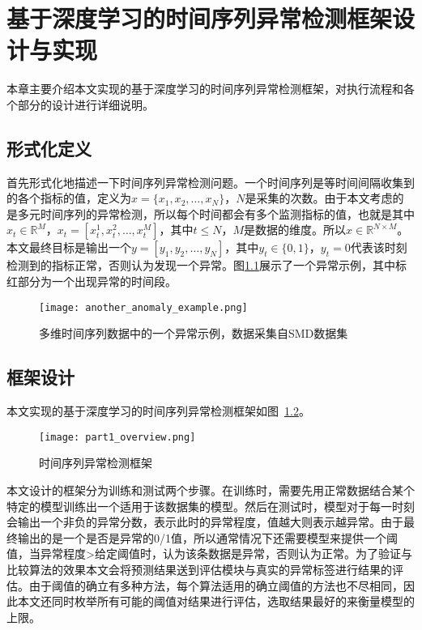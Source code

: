 
\chapter{基于深度学习的时间序列异常检测框架设计与实现}
\label{cha:anomaly:detection}
本章主要介绍本文实现的基于深度学习的时间序列异常检测框架，对执行流程和各个部分的设计进行详细说明。
\section{形式化定义}
首先形式化地描述一下时间序列异常检测问题。一个时间序列是等时间间隔收集到的各个指标的值，定义为$x=\{x_1,x_2,\dots,x_N\}$，$N$是采集的次数。由于本文考虑的是多元时间序列的异常检测，所以每个时间都会有多个监测指标的值，也就是其中$x_t\in \mathbb{R}^M$，$x_t=[x_t^1,x_t^2,\dots,x_t^M]$，其中$t\leq N$，$M$是数据的维度。所以$x\in \mathbb{R}^{N\times M}$。本文最终目标是输出一个$y=[y_1, y_2,\dots, y_N ]$，其中$y_t\in \{0,1\}$，$y_t=0$代表该时刻检测到的指标正常，否则认为发现一个异常。图\ref{fig:anomaly_example}展示了一个异常示例，其中标红部分为一个出现异常的时间段。
\begin{figure}[htbp]
  \centering
  \texttt{[image: another\_anomaly\_example.png]}
  \caption{多维时间序列数据中的一个异常示例，数据采集自SMD\cite{su2019robust}数据集}
  \label{fig:anomaly_example}
\end{figure}

\section{框架设计}
本文实现的基于深度学习的时间序列异常检测框架如图~\ref{fig:part1_overview}。

\begin{figure}[htbp]
    \centering
    \texttt{[image: part1\_overview.png]}
    \caption{时间序列异常检测框架}
    \label{fig:part1_overview}
  \end{figure}

本文设计的框架分为训练和测试两个步骤。在训练时，需要先用正常数据结合某个特定的模型训练出一个适用于该数据集的模型。然后在测试时，模型对于每一时刻会输出一个非负的异常分数，表示此时的异常程度，值越大则表示越异常。由于最终输出的是一个是否是异常的0/1值，所以通常情况下还需要模型来提供一个阈值，当异常程度>给定阈值时，认为该条数据是异常，否则认为正常。为了验证与比较算法的效果本文会将预测结果送到评估模块与真实的异常标签进行结果的评估。由于阈值的确立有多种方法，每个算法适用的确立阈值的方法也不尽相同，因此本文还同时枚举所有可能的阈值对结果进行评估，选取结果最好的来衡量模型的上限\cite{xu2018unsupervised,su2019robust,DBLP:conf/ipccc/LiCP18,DBLP:conf/infocom/ChenXLPCQFW19}。

